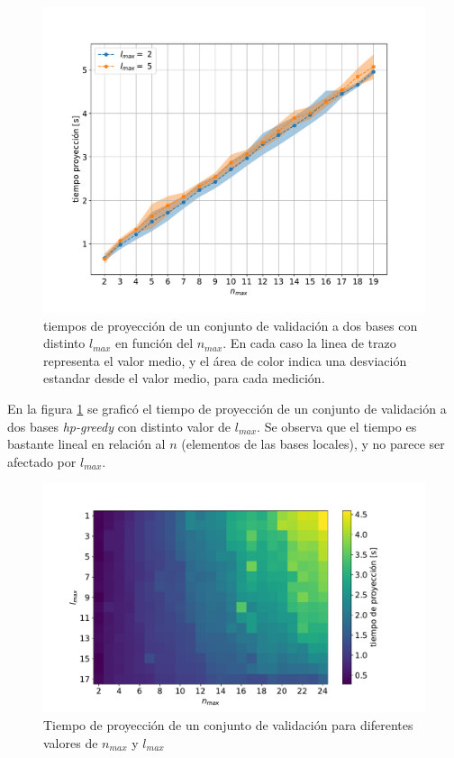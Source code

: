 \begin{figure}[h!]
\centering
\includegraphics[width=.8\columnwidth ,trim={0, 1cm, 0, 1.2cm}]{figs/t_vs_nmax.pdf}
\caption{tiempos de proyección de un conjunto de validación a dos bases con distinto $l_{max}$ en función del $n_{max}$. En cada caso la linea de trazo representa el valor medio, y el área de color indica una desviación estandar desde el valor medio, para cada medición.}
\label{fig:t_vs_nmax}
\end{figure}


En la figura \ref{fig:t_vs_nmax} se graficó el tiempo de proyección de un conjunto de validación a dos bases \textit{hp-greedy} con distinto valor de $l_{max}$. Se observa que el tiempo es bastante lineal en relación al $n$ (elementos de las bases locales), y no parece ser afectado por $l_{max}$.



\begin{figure}[h!]
\centering
\includegraphics[width=.9\columnwidth, trim={0, 1cm, 0, 1.4cm}]{figs/nmax_lmax_t_grid.pdf}
\caption{Tiempo de proyección de un conjunto de validación para diferentes valores de $n_{max}$ y $l_{max}$}
\label{fig:t_grilla_nl}
\end{figure}


